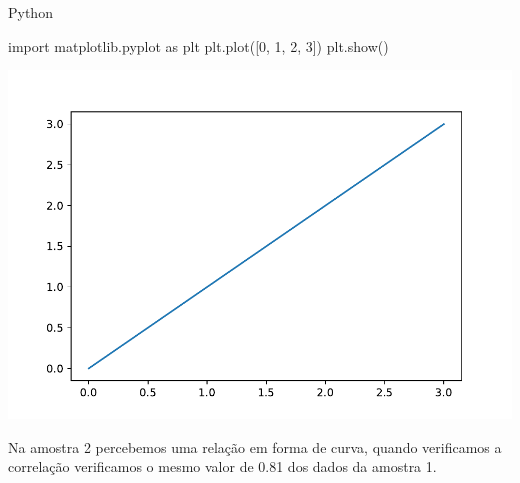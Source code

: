 \documentclass[
]{book}
\newenvironment{Shaded}{\begin{snugshade}}{\end{snugshade}}
\newcommand{\DecValTok}[1]{\textcolor[rgb]{0.00,0.00,0.81}{#1}}
\newcommand{\ImportTok}[1]{#1}
\newcommand{\NormalTok}[1]{#1}
\begin{document}
Python

\begin{Shaded}
\begin{Highlighting}[]
\ImportTok{import}\NormalTok{ matplotlib.pyplot }\ImportTok{as}\NormalTok{ plt}
\NormalTok{plt.plot([}\DecValTok{0}\NormalTok{, }\DecValTok{1}\NormalTok{, }\DecValTok{2}\NormalTok{, }\DecValTok{3}\NormalTok{])}
\NormalTok{plt.show()}
\end{Highlighting}
\end{Shaded}

\includegraphics{_main_files/figure-latex/unnamed-chunk-16-1.pdf}

Na amostra 2 percebemos uma relação em forma de curva, quando verificamos a correlação verificamos o mesmo valor de 0.81 dos dados da amostra 1.

  
\end{document}
